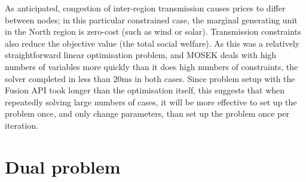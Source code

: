 \documentclass[11pt,a4paper]{article}
\numberwithin{equation}{section}
\begin{document}
As anticipated, congestion of inter-region transmission causes prices to differ between nodes; in this particular constrained case, the marginal generating unit in the North region is zero-cost (such as wind or solar).
Transmission constraints also reduce the objective value (the total social welfare).
As this was a relatively straightforward linear optimisation problem, and MOSEK deals with high numbers of variables more quickly than it does high numbers of constraints, the solver completed in less than 20ms in both cases.
Since problem setup with the Fusion API took longer than the optimisation itself, this suggests that when repeatedly solving large numbers of cases, it will be more effective to set up the problem once, and only change parameters, than set up the problem once per iteration.

\FloatBarrier

\section{Dual problem}
\label{sec:dual}
\end{document}
